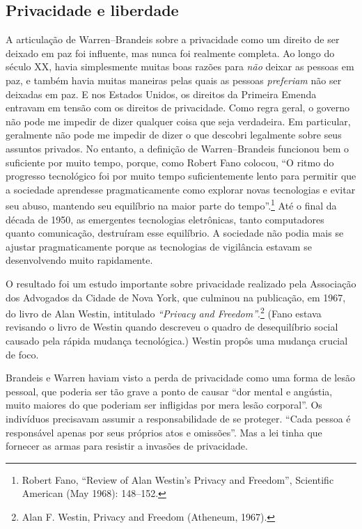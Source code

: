 \documentclass{book}
\newcommand{\ingles}[1]{\textit{#1}}
\begin{document}
\subsection{Privacidade e liberdade}
\label{quem:privacidade}

A articulação de Warren--Brandeis sobre a privacidade como um direito de ser
deixado em paz foi influente, mas nunca foi realmente completa. Ao longo do
século XX, havia simplesmente muitas boas razões para \emph{não} deixar as pessoas
em paz, e também havia muitas maneiras pelas quais as pessoas \emph{preferiam} não
ser deixadas em paz. E nos Estados Unidos, os direitos da Primeira Emenda
entravam em tensão com os direitos de privacidade. Como regra geral, o governo
não pode me impedir de dizer qualquer coisa que seja verdadeira. Em particular,
geralmente não pode me impedir de dizer o que descobri legalmente sobre seus
assuntos privados. No entanto, a definição de Warren--Brandeis funcionou bem
o suficiente por muito tempo, porque, como Robert Fano colocou, ``O ritmo do
progresso tecnológico foi por muito tempo suficientemente lento para permitir
que a sociedade aprendesse pragmaticamente como explorar novas tecnologias e
evitar seu abuso, mantendo seu equilíbrio na maior parte do tempo''.\footnote{Robert
Fano, ``Review of Alan Westin’s Privacy and Freedom'', Scientific American
(May 1968): 148–152.} Até o final da década de 1950, as emergentes tecnologias
eletrônicas, tanto computadores quanto comunicação, destruíram esse equilíbrio.
A sociedade não podia mais se ajustar pragmaticamente porque as tecnologias de
vigilância estavam se desenvolvendo muito rapidamente.

O resultado foi um estudo importante sobre privacidade realizado pela Associação
dos Advogados da Cidade de Nova York, que culminou na publicação, em 1967, do
livro de Alan Westin, intitulado \ingles{``Privacy and Freedom''}.\footnote{
Alan F. Westin, Privacy and Freedom (Atheneum, 1967).} (Fano estava
revisando o livro de Westin quando descreveu o quadro de desequilíbrio social
causado pela rápida mudança tecnológica.) Westin propôs uma mudança crucial de foco.

Brandeis e Warren haviam visto a perda de privacidade como uma forma de lesão
pessoal, que poderia ser tão grave a ponto de causar ``dor mental e angústia,
muito maiores do que poderiam ser infligidas por mera lesão corporal''. Os
indivíduos precisavam assumir a responsabilidade de se proteger. ``Cada pessoa
é responsável apenas por seus próprios atos e omissões''. Mas a lei tinha que
fornecer as armas para resistir a invasões de privacidade.
\end{document}

